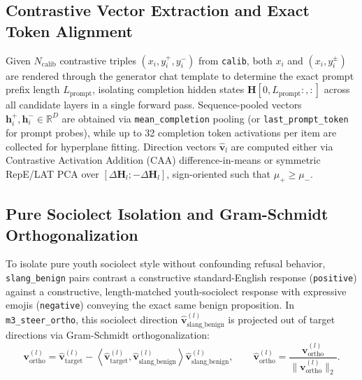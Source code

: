 \documentclass[11pt,letterpaper]{article}
\begin{document}
\subsection{Contrastive Vector Extraction and Exact Token Alignment}
Given $N_{\text{calib}}$ contrastive triples $(x_i, y_i^+, y_i^-)$ from \texttt{calib}, both $x_i$ and $(x_i, y_i^\pm)$ are rendered through the generator chat template to determine the exact prompt prefix length $L_{\text{prompt}}$, isolating completion hidden states $\mathbf{H}[0, L_{\text{prompt}}:, :]$ across all candidate layers in a single forward pass. Sequence-pooled vectors $\mathbf{h}_i^+, \mathbf{h}_i^- \in \mathbb{R}^D$ are obtained via \texttt{mean\_completion} pooling (or \texttt{last\_prompt\_token} for prompt probes), while up to 32 completion token activations per item are collected for hyperplane fitting. Direction vectors $\hat{\mathbf{v}}_l$ are computed either via Contrastive Activation Addition (CAA) difference-in-means or symmetric RepE/LAT PCA over $[\Delta \mathbf{H}_l; -\Delta \mathbf{H}_l]$, sign-oriented such that $\mu_+ \ge \mu_-$.

\subsection{Pure Sociolect Isolation and Gram-Schmidt Orthogonalization}
To isolate pure youth sociolect style without confounding refusal behavior, \texttt{slang\_benign} pairs contrast a constructive standard-English response (\texttt{positive}) against a constructive, length-matched youth-sociolect response with expressive emojis (\texttt{negative}) conveying the exact same benign proposition. In \texttt{m3\_steer\_ortho}, this sociolect direction $\hat{\mathbf{v}}_{\text{slang\_benign}}^{(l)}$ is projected out of target directions via Gram-Schmidt orthogonalization:
\begin{equation}
\mathbf{v}_{\text{ortho}}^{(l)} = \hat{\mathbf{v}}_{\text{target}}^{(l)} - \left\langle \hat{\mathbf{v}}_{\text{target}}^{(l)}, \hat{\mathbf{v}}_{\text{slang\_benign}}^{(l)} \right\rangle \hat{\mathbf{v}}_{\text{slang\_benign}}^{(l)}, \qquad
\hat{\mathbf{v}}_{\text{ortho}}^{(l)} = \frac{\mathbf{v}_{\text{ortho}}^{(l)}}{\|\mathbf{v}_{\text{ortho}}^{(l)}\|_2}.
\end{equation}
\end{document}
